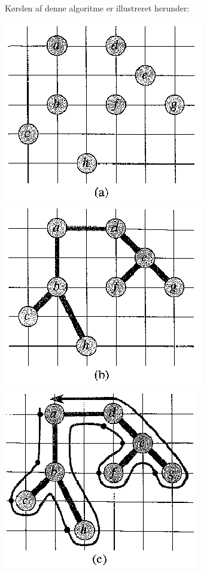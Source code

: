 Kørslen af denne algoritme er illustreret herunder:
\begin{center}
 \includegraphics[bb=0 0 247 226,scale=0.7]{img/approxTSP1.png}
 \includegraphics[bb=0 0 247 226,scale=0.7]{img/approxTSP2.png}
 \includegraphics[bb=0 0 247 226,scale=0.7]{img/approxTSP3.png}

\end{center}
